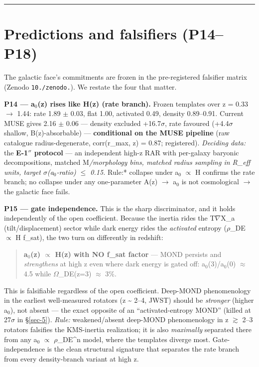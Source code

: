 \documentclass[aps,prd,preprint,nofootinbib,superscriptaddress]{revtex4-2}
\begin{document}
\begin{center}\rule{0.5\linewidth}{0.5pt}\end{center}

\section{Predictions and falsifiers (P14--P18)}\label{sec-7}

The galactic face's commitments are frozen in the pre-registered
falsifier matrix (Zenodo \texttt{10./\allowbreak zenodo.}). We restate
the four that matter.

\textbf{P14 --- a\(_{0}\)(z) rises like H(z) (rate branch).} Frozen
templates over z = 0.33 \(\to\) 1.44: rate 1.89 \(\pm\) 0.03, flat 1.00,
activated 0.49, density 0.89--0.91. Current MUSE gives 2.16 \(\pm\) 0.06
--- density excluded +16.7\(\sigma\), rate favoured (+4.4\(\sigma\)
shallow, B(z)-absorbable) --- \textbf{conditional on the MUSE pipeline}
(raw catalogue radius-degenerate, corr(r\_max, z) = 0.87; registered).
\emph{Deciding data:} the \textbf{E-1\(''\) protocol} --- an independent
high-z RAR with per-galaxy baryonic decompositions, matched
M\emph{/morphology bins, matched radius sampling in R\_eff units, target
\(\sigma\)(a\(_{0}\)-ratio) \(\leq\) 0.15. }Rule:* collapse under
a\(_{0}\) \(\propto\) H confirms the rate branch; no collapse under any
one-parameter A(z) \(\to\) a\(_{0}\) is not cosmological \(\to\) the
galactic face fails.

\textbf{P15 --- gate independence.} This is the sharp discriminator, and
it holds independently of the open coefficient. Because the inertia
rides the T\(\nabla\)X\_a (tilt/displacement) sector while dark energy
rides the \emph{activated} entropy (\(\rho\)\_DE \(\propto\) H f\_sat),
the two turn on differently in redshift:

\begin{quote}
\textbf{a\(_{0}\)(z) \(\propto\) H(z) with NO f\_sat factor} --- MOND
persists and \emph{strengthens} at high z even where dark energy is
gated off: a\(_{0}\)(3)/a\(_{0}\)(0) \(\approx\) 4.5 while
\(\Omega\)\_DE(z=3) \(\approx\) 3\%.
\end{quote}

This is falsifiable regardless of the open coefficient. Deep-MOND
phenomenology in the earliest well-measured rotators (z
\textasciitilde{} 2--4, JWST) should be \emph{stronger} (higher
a\(_{0}\)), not absent --- the exact opposite of an ``activated-entropy
MOND'' (killed at 27\(\sigma\) in §\ref{sec-5}). \emph{Rule:}
weakened/absent deep-MOND phenomenology in z \(\gtrsim\) 2--3 rotators
falsifies the KMS-inertia realization; it is also \emph{maximally}
separated there from any a\(_{0}\) \(\propto\) \(\rho\)\_DE\^{}n model,
where the templates diverge most. Gate-independence is the clean
structural signature that separates the rate branch from every
density-branch variant at high z.
\end{document}
